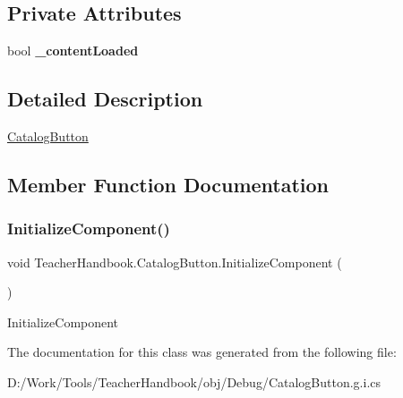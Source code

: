 \subsection*{Private Attributes}
\begin{DoxyCompactItemize}
\item 
\mbox{\label{class_teacher_handbook_1_1_catalog_button_a841881f1c8ba418ddd09ae373f0a51aa}} 
bool {\bfseries \+\_\+content\+Loaded}
\end{DoxyCompactItemize}


\subsection{Detailed Description}
\mbox{\hyperlink{class_teacher_handbook_1_1_catalog_button}{Catalog\+Button}} 



\subsection{Member Function Documentation}
\mbox{\label{class_teacher_handbook_1_1_catalog_button_adb12d2ac86d6ce2674849f4fde4d4517}} 
\subsubsection{\texorpdfstring{Initialize\+Component()}{InitializeComponent()}}
{\footnotesize\ttfamily void Teacher\+Handbook.\+Catalog\+Button.\+Initialize\+Component (\begin{DoxyParamCaption}{ }\end{DoxyParamCaption})}



Initialize\+Component 



The documentation for this class was generated from the following file\+:\begin{DoxyCompactItemize}
\item 
D\+:/\+Work/\+Tools/\+Teacher\+Handbook/obj/\+Debug/Catalog\+Button.\+g.\+i.\+cs\end{DoxyCompactItemize}
